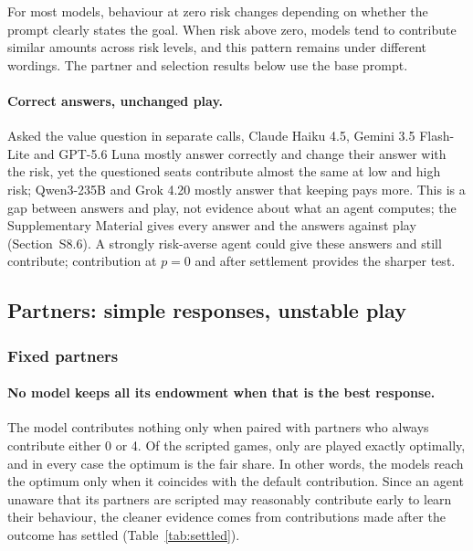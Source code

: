 \documentclass[sigconf,anonymous]{aamas}
\begin{document}
For most models, behaviour at zero risk changes depending on whether the prompt clearly states the goal. When risk above zero, models tend to contribute  similar amounts across risk levels, and this pattern remains under different wordings. The partner and selection results below use the base prompt.

\begin{table}[t]
\caption{Mean seat total under prompt and decoding changes. Top: pooled over $p=0.1$ and $0.9$ (20 games each). \emph{Rerun} repeats the base prompt with in-game questions; \emph{Para.\,1, 2} are the rewordings; \emph{Wording} is the neutral wording and \emph{Goal} adds the stated goal. Bold: a shift from \emph{Base} of at least 2 units with permutation $P<0.01$; every bold shift also has $P<0.001$, below the Bonferroni threshold for the 35 comparisons. Bottom: single risk levels (10 games each).}
\label{tab:robust}
\small
\setlength{\tabcolsep}{4pt}

\end{table}

\paragraph{Correct answers, unchanged play.}
Asked the value question in separate calls, Claude Haiku 4.5, Gemini 3.5 Flash-Lite and GPT-5.6 Luna mostly answer correctly and change their answer with the risk, yet the questioned seats contribute almost the same at low and high risk; Qwen3-235B and Grok 4.20 mostly answer that keeping pays more. This is a gap between answers and play, not evidence about what an agent computes; the Supplementary Material gives every answer and the answers against play (Section~S8.6). A strongly risk-averse agent could give these answers and still contribute; contribution at $p=0$ and after settlement provides the sharper test.

\subsection{Partners: simple responses,  unstable play}
\label{sec:partners}

\subsubsection{Fixed partners}
\label{sec:scripted}

\paragraph{No model keeps all its endowment  when that is the best response.}
The model contributes nothing only when paired with partners who always contribute either 0 or 4. Of the \ScrGames{} scripted games, only \ScrOptimalGames{} are played exactly optimally, and in every case the optimum is the fair share. In other words, the models reach the optimum only when it coincides with the default contribution. Since an agent unaware that its partners are scripted may reasonably contribute early to learn their behaviour, the cleaner evidence comes from contributions made after the outcome has settled (Table~\ref{tab:settled}).
\end{document}
